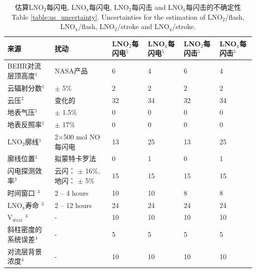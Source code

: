 \begin{table}[t]
\centering
\scriptsize
\caption{估算LNO$_\textrm{2}$每闪电, LNO$_\textrm{x}$每闪电, LNO$_\textrm{2}$每闪击 and LNO$_\textrm{x}$每闪击的不确定性\\ Table \ref{table:us_uncertainty}. Uncertainties for the estimation of LNO$_\textrm{2}$/flash, LNO$_\textrm{x}$/flash, LNO$_\textrm{2}$/stroke and LNO$_\textrm{x}$/stroke.}
\begin{tabular}{llllll}
\hline
\textbf{来源} & \textbf{扰动} & \textbf{LNO$_\textrm{2}$每闪电$^5$} & \textbf{LNO$_\textrm{x}$每闪电$^5$} & \textbf{LNO$_\textrm{2}$每闪击$^5$} & \textbf{LNO$_\textrm{x}$每闪击$^5$} \\
\hline
BEHR对流层顶高度$^1$                    & NASA产品                              & 6   & 4   & 6   & 4 \\
云辐射分数$^1$                          & $\pm$ 5\%                            & 2   & 2   & 2   & 2 \\
云压$^2$                               & 变化的                                & 32  & 34  & 32  & 34 \\
地表气压$^1$                            & $\pm$ 1.5\%                          & 0   & 0   & 0   & 0 \\
地表反照率$^1$                          & $\pm$ 17\%                           & 0   & 0   & 0   & 0 \\
LNO$_\textrm{2}$廓线$^1$               & 2$\times$500 mol NO每闪电             & 13  & 25  & 13  & 25 \\
廓线位置$^1$                            & 拟蒙特卡罗法                           & 0   & 1   & 0   & 1 \\
闪电探测效率$^3$                        & 云闪： $\pm$ 16\%, 地闪： $\pm$ 5\%        & 15  & 15  & 15  & 15 \\
时间窗口%
$^3$                                  & 2 -- 4 hours                         & 10  & 10  & 8   & 8 \\
LNO$_\textrm{x}$寿命%
$^3$                                  & 2 -- 12 hours                        & 24  & 24  & 24  & 24 \\
V$_\textrm{strat}$%
$^4$                                  & -                                    & 10  & 10  & 10  & 10 \\
斜柱密度的系统误差$^4$                   & -                                    & 5   & 5   & 5   & 5 \\
对流层背景浓度$^4$           & -                                    & 10  & 10  & 10  & 10  \\

\end{tabular}
\end{table}
